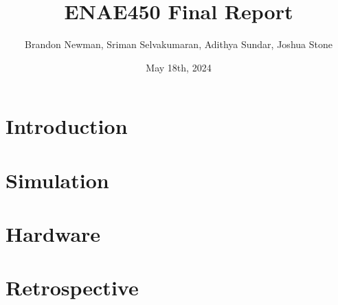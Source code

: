 \documentclass{article}
\title{ENAE450 Final Report}
\author{Brandon Newman, Sriman Selvakumaran, Adithya Sundar, Joshua Stone}
\date{May 18th, 2024}
\begin{document}
\maketitle

\section{Introduction}

\section{Simulation}

\section{Hardware}

\section{Retrospective}
\end{document}

